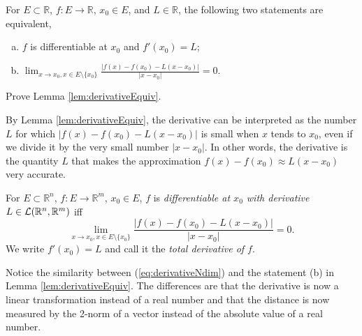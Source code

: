 \begin{lem}
  \label{lem:derivativeEquiv}
  For $E\subset \mathbb{R}$, $f: E\rightarrow \mathbb{R}$,
  $x_0\in E$, and $L\in \mathbb{R}$,
  the following two statements are equivalent,
  \begin{enumerate}[(a)]\itemsep0em
  \item $f$ is differentiable at $x_0$ and $f'(x_0)=L$;
  \item $\lim_{x\rightarrow x_0, x\in E\setminus\{x_0\}} \frac{|f(x)-
      f(x_0) - L(x-x_0)|}{|x-x_0|}=0$.
  \end{enumerate}
\end{lem}

\begin{exc}
  Prove Lemma \ref{lem:derivativeEquiv}.
\end{exc}

\begin{rem}
  By Lemma \ref{lem:derivativeEquiv},
  the derivative can be interpreted as the number $L$
  for which $|f(x)- f(x_0)-L(x-x_0)|$ is small when $x$ tends to $x_0$,
  even if we divide it by the very small number $|x-x_0|$.
  In other words, the derivative is the quantity $L$
  that makes the approximation $f(x)-f(x_0) \approx L(x-x_0)$
  very accurate.
\end{rem}

\begin{defn}
  \label{def:derivativeNdim}
  For $E\subset \mathbb{R}^n$, $f: E\rightarrow \mathbb{R}^m$,
  $x_0\in E$, $f$ is \emph{differentiable at $x_0$ with derivative}
  $L\in{\cal L}(\mathbb{R}^n,\mathbb{R}^m)$
  iff 
  \begin{equation}
    \label{eq:derivativeNdim}
    \lim_{x\rightarrow x_0, x\in E\setminus\{x_0\}}
    \frac{|f(x)- f(x_0) - L(x-x_0)|}{|x-x_0|}=0. 
  \end{equation}
  We write $f'(x_0)=L$
  and call it the \emph{total derivative of $f$}.
\end{defn}

\begin{rem}
  Notice the similarity between (\ref{eq:derivativeNdim})
  and the statement (b) in Lemma \ref{lem:derivativeEquiv}.
  The differences are that the derivative is now a linear
  transformation instead of a real number
  and that the distance is now measured by the 2-norm of a vector
  instead of the absolute value of a real number.  
\end{rem}

